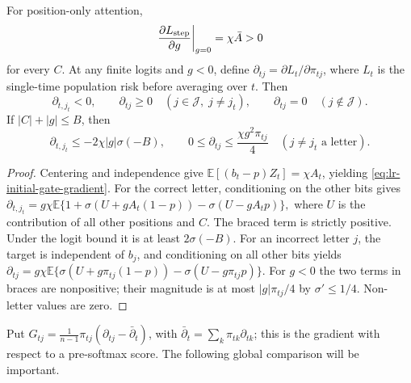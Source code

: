 \begin{lrlemma}
\label{lem:lr-signs}
For position-only attention,
\begin{equation}\label{eq:lr-initial-gate-gradient}
 \left.\frac{\partial L_{\mathrm{step}}}{\partial g}\right|_{g=0}
 =\chi\bar A>0
\end{equation}
for every $C$.  At any finite logits and $g<0$, define
$\partial_{tj}=\partial L_t/\partial \pi_{tj}$, where $L_t$ is the single-time
population risk before averaging over $t$.  Then
\begin{equation}\label{eq:lr-feature-source-signs}
 \partial_{t,j_t}<0,\qquad \partial_{tj}\ge0
 \quad(j\in\mathcal J,\;j\ne j_t),\qquad
 \partial_{tj}=0\quad(j\notin\mathcal J).
\end{equation}
If $|C|+|g|\le B$, then
\begin{equation}\label{eq:lr-source-bounds}
 \partial_{t,j_t}\le-2\chi|g|\sigma(-B),\qquad
 0\le \partial_{tj}\le\frac{\chi g^2\pi_{tj}}4\quad(j\ne j_t\text{ a letter}).
\end{equation}
\end{lrlemma}
\begin{proof}
Centering and independence give
$\mathbb E[(b_t-p)Z_t]=\chi A_t$, yielding
\eqref{eq:lr-initial-gate-gradient}.  For the correct letter,
conditioning on the other bits gives
 $\partial_{t,j_t}=g\chi\mathbb E \{1+\sigma(U+gA_t(1-p))-\sigma(U-gA_tp)\},$ 
where $U$ is the contribution of all other positions and $C$.
The braced term is strictly positive.  Under the logit bound it is at
least $2\sigma(-B)$.  For an incorrect letter $j$, the target is
independent of $b_j$, and conditioning on all other bits yields
 $\partial_{tj}=g\chi\mathbb E \{\sigma(U+g\pi_{tj}(1-p))-\sigma(U-g\pi_{tj}p)\}.$ 
For $g<0$ the two terms in braces are nonpositive; their magnitude is
at most $|g|\pi_{tj}/4$ by $\sigma'\le1/4$.  Non-letter values are zero.
\end{proof}

Put $G_{tj}=\frac1{n-1}\pi_{tj}(\partial_{tj}-\bar\partial_t)$, with
$\bar\partial_t=\sum_k\pi_{tk}\partial_{tk}$; this is the gradient with respect to a
pre-softmax score.  The following global comparison will be important.


